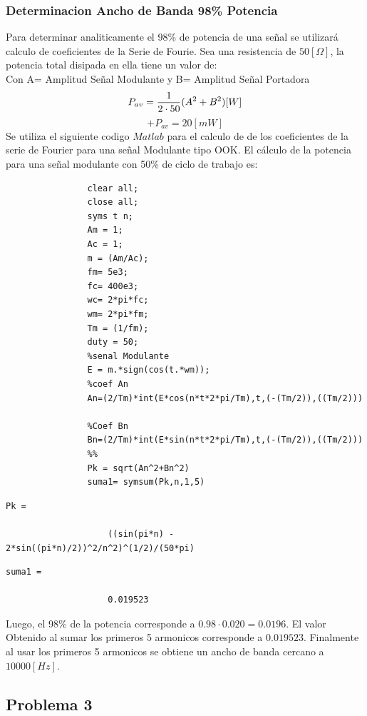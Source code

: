 \documentclass[letterpaper, titlepage]{article}
\begin{document}
		\subsubsection{Determinacion Ancho de Banda 98\% Potencia}
			Para determinar analiticamente el 98\% de potencia de una señal se utilizará calculo de 			coeficientes de la Serie de Fourie. Sea una resistencia de $50[\Omega]$, la potencia total disipada en ella tiene un valor de:\\
			Con A= Amplitud Señal Modulante y B= Amplitud Señal Portadora\\	
			\begin{equation}	
				P_{av}={1 \over 2 \cdot 50}(A^{2}+B^{2})[W]
			\end{equation}
			\begin{equation}
				+P_{av}=20[mW]	
			\end{equation}
			Se utiliza el siguiente codigo $Matlab$ para el calculo de de los coeficientes de la serie de Fourier para una señal Modulante tipo OOK. El cálculo de la potencia para una señal modulante con 50\% de ciclo de trabajo es: 
			\begin{lstlisting}[label=some-code,caption=Codigo Matlab OOK]
				%%
				clear all;
				close all;
				syms t n;
				Am = 1;
				Ac = 1;
				m = (Am/Ac);
				fm= 5e3; 
				fc= 400e3;
				wc= 2*pi*fc;
				wm= 2*pi*fm;
				Tm = (1/fm);
				duty = 50;
				%senal Modulante
				E = m.*sign(cos(t.*wm));
				%coef An
				An=(2/Tm)*int(E*cos(n*t*2*pi/Tm),t,(-(Tm/2)),((Tm/2)))

				%Coef Bn
				Bn=(2/Tm)*int(E*sin(n*t*2*pi/Tm),t,(-(Tm/2)),((Tm/2)))
				%%
				Pk = sqrt(An^2+Bn^2)
				suma1= symsum(Pk,n,1,5)
			\end{lstlisting}
			\begin{lstlisting}[label=some-code,caption=Codigo Matlab OOK Potencia]	
					Pk =
 
					((sin(pi*n) - 2*sin((pi*n)/2))^2/n^2)^(1/2)/(50*pi)
			\end{lstlisting}

			\begin{lstlisting}[label=some-code,caption=Codigo Matlab OOK Potencia]
					suma1 =
 
					0.019523
			\end{lstlisting}
			Luego, el 98\% de la potencia corresponde a $0.98 \cdot 0.020=0.0196$. El valor Obtenido al sumar los primeros 5 armonicos corresponde a $0.019523$. Finalmente al usar los primeros 5 armonicos se obtiene un ancho de banda cercano a $10000[Hz]$.
			\newpage
	\subsection{Problema 3}
	
\end{document}
